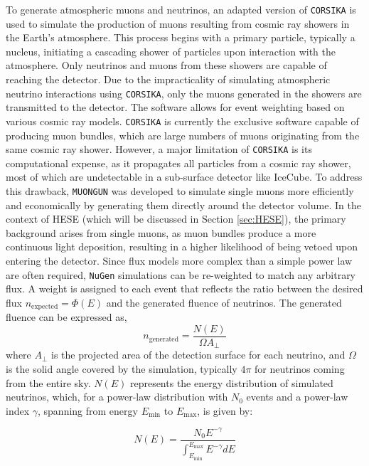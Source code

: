 To generate atmospheric muons and neutrinos, an adapted version of \texttt{CORSIKA}  is used to simulate the production of muons resulting from cosmic ray showers in the Earth's atmosphere. This process begins with a primary particle, typically a nucleus, initiating a cascading shower of particles upon interaction with the atmosphere. Only neutrinos and muons from these showers are capable of reaching the detector. Due to the impracticality of simulating atmospheric neutrino interactions using \texttt{CORSIKA}, only the muons generated in the showers are transmitted to the detector. The software allows for event weighting based on various cosmic ray models. \texttt{CORSIKA} is currently the exclusive software capable of producing muon bundles, which are large numbers of muons originating from the same cosmic ray shower. However, a major limitation of \texttt{CORSIKA} is its computational expense, as it propagates all particles from a cosmic ray shower, most of which are undetectable in a sub-surface detector like IceCube. To address this drawback, \texttt{MUONGUN}  was developed to simulate single muons more efficiently and economically by generating them directly around the detector volume. In the context of HESE (which will be discussed in Section \ref{sec:HESE}), the primary background arises from single muons, as muon bundles produce a more continuous light deposition, resulting in a higher likelihood of being vetoed upon entering the detector.
Since flux models more complex than a simple power law are often required, \texttt{NuGen} simulations can be re-weighted to match any arbitrary flux. A weight is assigned to each event that reflects the ratio between the desired flux $n_{\mathrm{expected}} = \Phi(E) $ and the generated fluence of neutrinos. The generated fluence can be expressed as,
\begin{equation}
    n_{\mathrm{generated}} = \frac{N(E)}{\Omega A_\perp}
\end{equation}
where $A_\perp$ is the projected area of the detection surface for each neutrino, and $\Omega$ is the solid angle covered by the simulation, typically $4\pi$ for neutrinos coming from the entire sky. $N(E)$ represents the energy distribution of simulated neutrinos, which, for a power-law distribution with $N_0$ events and a power-law index $\gamma$, spanning from energy $E_{\text{min}}$ to $E_{\text{max}}$, is given by:

\begin{equation}
    N(E) = \frac{N_0 E^{-\gamma}} {\int_{E_{\text{min}}}^{E_{\text{max}}} E^{-\gamma} dE}
\end{equation}

